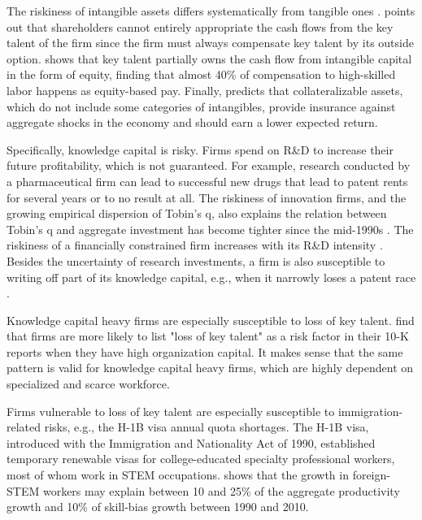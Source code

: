 \documentclass[12pt, letterpaper]{article}
\begin{document}
The riskiness of intangible assets differs systematically from tangible ones \citep{Hansen2005-xe}. \citep{Eisfeldt2013-ad} points out that shareholders cannot entirely appropriate the cash flows from the key talent of the firm since the firm must always compensate key talent by its outside option. \citep{Eisfeldt2018-iy} shows that key talent partially owns the cash flow from intangible capital in the form of equity, finding that almost 40\% of compensation to high-skilled labor happens as equity-based pay. Finally, \citep{Ai2019-wd} predicts that collateralizable assets, which do not include some categories of intangibles, provide insurance against aggregate shocks in the economy and should earn a lower expected return.

Specifically, knowledge capital is risky. Firms spend on R\&D to increase their future profitability, which is not guaranteed. For example, research conducted by a pharmaceutical firm can lead to successful new drugs that lead to patent rents for several years or to no result at all. The riskiness of innovation firms, and the growing empirical dispersion of Tobin's q, also explains the relation between Tobin's q and aggregate investment has become tighter since the mid-1990s \citep{Andrei2019-bh}. The riskiness of a financially constrained firm increases with its R\&D intensity \citep{Li2011-ay}. Besides the uncertainty of research investments, a firm is also susceptible to writing off part of its knowledge capital, e.g., when it narrowly loses a patent race \citep{Peters2017-fl}.

Knowledge capital heavy firms are especially susceptible to loss of key talent. \citep{Eisfeldt2013-ad} find that firms are more likely to list "loss of key talent" as a risk factor in their 10-K reports when they have high organization capital. It makes sense that the same pattern is valid for knowledge capital heavy firms, which are highly dependent on specialized and scarce workforce.

Firms vulnerable to loss of key talent are especially susceptible to immigration-related risks, e.g., the H-1B visa annual quota shortages. The H-1B visa, introduced with the Immigration and Nationality Act of 1990, established temporary renewable visas for college-educated specialty professional workers, most of whom work in STEM occupations. \citep{Peri2015-qt} shows that the growth in foreign-STEM workers may explain between 10 and 25\% of the aggregate productivity growth and 10\% of skill-bias growth between 1990 and 2010.
\end{document}
